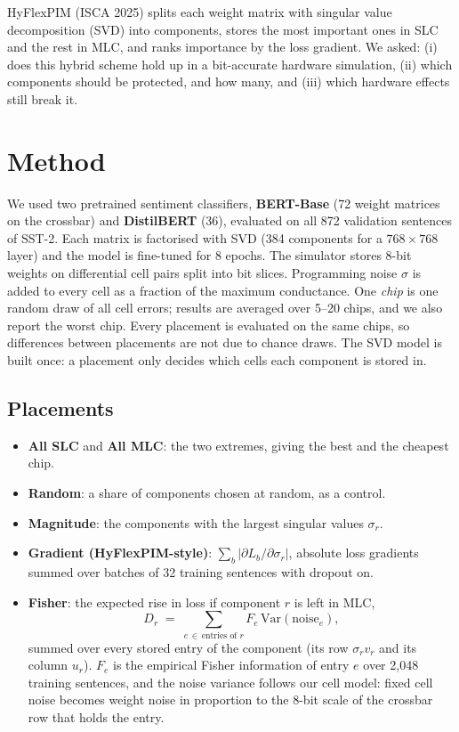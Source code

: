 \documentclass[10pt,a4paper]{article}
\begin{document}
HyFlexPIM (ISCA 2025) splits each weight matrix with singular value decomposition (SVD) into components,
stores the most important ones in SLC and the rest in MLC, and ranks importance by the loss gradient. We
asked: (i) does this hybrid scheme hold up in a bit-accurate hardware simulation, (ii) which components
should be protected, and how many, and (iii) which hardware effects still break it.

\section{Method}
We used two pretrained sentiment classifiers, \textbf{BERT-Base} (72 weight matrices on the crossbar) and
\textbf{DistilBERT} (36), evaluated on all 872 validation sentences of SST-2. Each matrix is factorised
with SVD (384 components for a $768\times768$ layer) and the model is fine-tuned for 8 epochs. The
simulator stores 8-bit weights on differential cell pairs split into bit slices. Programming noise $\sigma$
is added to every cell as a fraction of the maximum conductance. One \emph{chip} is one random draw of all
cell errors; results are averaged over 5--20 chips, and we also report the worst chip. Every placement is
evaluated on the same chips, so differences between placements are not due to chance draws. The SVD model
is built once: a placement only decides which cells each component is stored in.

\subsection{Placements}
\begin{itemize}
\item \textbf{All SLC} and \textbf{All MLC}: the two extremes, giving the best and the cheapest chip.
\item \textbf{Random}: a share of components chosen at random, as a control.
\item \textbf{Magnitude}: the components with the largest singular values $\sigma_r$.
\item \textbf{Gradient (HyFlexPIM-style)}: $\sum_b |\partial L_b/\partial\sigma_r|$, absolute loss gradients
summed over batches of 32 training sentences with dropout on.
\item \textbf{Fisher}: the expected rise in loss if component $r$ is left in MLC,
\[
  D_r \;=\; \sum_{e\,\in\,\text{entries of } r} F_e\,\mathrm{Var}(\text{noise}_e),
\]
summed over every stored entry of the component (its row $\sigma_r v_r$ and its column $u_r$). $F_e$ is
the empirical Fisher information of entry $e$ over 2{,}048 training sentences, and the noise variance
follows our cell model: fixed cell noise becomes weight noise in proportion to the 8-bit scale of the
crossbar row that holds the entry.
\end{itemize}
\end{document}

